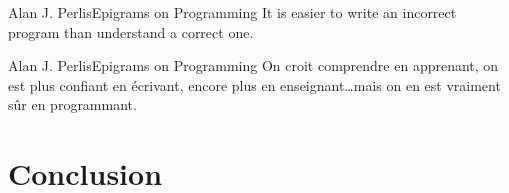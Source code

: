 \begin{epigraphe}[english]{Alan J. Perlis}{Epigrams on Programming}
  It is easier to write an incorrect program than understand a correct one.
\end{epigraphe}

\begin{epigraphe}{Alan J. Perlis}{Epigrams on Programming}
  On croit comprendre en apprenant, on est plus confiant en écrivant, encore plus en enseignant\dots mais on en est vraiment sûr en programmant.
\end{epigraphe}

\section{Conclusion}
